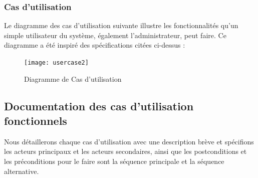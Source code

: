  \subsubsection{ Cas d’utilisation }

Le diagramme des cas d’utilisation suivante illustre les fonctionnalités qu’un simple utilisateur du système, également l’administrateur, peut faire. Ce diagramme a été inspiré des spécifications citées ci-dessus :
 
 \begin{figure}[H]
 	\centering
 	\texttt{[image: usercase2]}
 	\caption{Diagramme de Cas d’utilisation}
 	\label{fig:usercase2}
 \end{figure}
 
 \subsection{ Documentation des cas d’utilisation fonctionnels }
Nous détaillerons chaque cas d'utilisation avec une description brève et spécifions les acteurs principaux et les acteurs secondaires, ainsi que les postconditions et les préconditions pour le faire sont la séquence principale et la séquence alternative.


